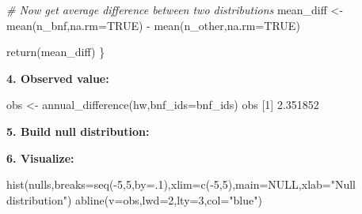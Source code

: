 \documentclass[
]{book}
\newenvironment{Shaded}{\begin{snugshade}}{\end{snugshade}}
\newcommand{\AttributeTok}[1]{\textcolor[rgb]{0.77,0.63,0.00}{#1}}
\newcommand{\CommentTok}[1]{\textcolor[rgb]{0.56,0.35,0.01}{\textit{#1}}}
\newcommand{\ConstantTok}[1]{\textcolor[rgb]{0.00,0.00,0.00}{#1}}
\newcommand{\ControlFlowTok}[1]{\textcolor[rgb]{0.13,0.29,0.53}{\textbf{#1}}}
\newcommand{\DecValTok}[1]{\textcolor[rgb]{0.00,0.00,0.81}{#1}}
\newcommand{\FloatTok}[1]{\textcolor[rgb]{0.00,0.00,0.81}{#1}}
\newcommand{\FunctionTok}[1]{\textcolor[rgb]{0.00,0.00,0.00}{#1}}
\newcommand{\NormalTok}[1]{#1}
\newcommand{\OtherTok}[1]{\textcolor[rgb]{0.56,0.35,0.01}{#1}}
\newcommand{\SpecialCharTok}[1]{\textcolor[rgb]{0.00,0.00,0.00}{#1}}
\newcommand{\StringTok}[1]{\textcolor[rgb]{0.31,0.60,0.02}{#1}}
\begin{document}
\begin{Shaded}
\begin{Highlighting}[]
  \CommentTok{\# Now get average difference between two distributions}
\NormalTok{  mean\_diff }\OtherTok{\textless{}{-}} \FunctionTok{mean}\NormalTok{(n\_bnf,}\AttributeTok{na.rm=}\ConstantTok{TRUE}\NormalTok{) }\SpecialCharTok{{-}} \FunctionTok{mean}\NormalTok{(n\_other,}\AttributeTok{na.rm=}\ConstantTok{TRUE}\NormalTok{)}
  
  \FunctionTok{return}\NormalTok{(mean\_diff)}
\NormalTok{\}}
\end{Highlighting}
\end{Shaded}

\textbf{4. Observed value:}

\begin{Shaded}
\begin{Highlighting}[]
\NormalTok{obs }\OtherTok{\textless{}{-}} \FunctionTok{annual\_difference}\NormalTok{(hw,}\AttributeTok{bnf\_ids=}\NormalTok{bnf\_ids)}
\NormalTok{obs }
\NormalTok{[}\DecValTok{1}\NormalTok{] }\FloatTok{2.351852}
\end{Highlighting}
\end{Shaded}

\textbf{5. Build null distribution:}

\begin{Shaded}
\end{Shaded}

\textbf{6. Visualize:}

\begin{Shaded}
\begin{Highlighting}[]
\FunctionTok{hist}\NormalTok{(nulls,}\AttributeTok{breaks=}\FunctionTok{seq}\NormalTok{(}\SpecialCharTok{{-}}\DecValTok{5}\NormalTok{,}\DecValTok{5}\NormalTok{,}\AttributeTok{by=}\NormalTok{.}\DecValTok{1}\NormalTok{),}\AttributeTok{xlim=}\FunctionTok{c}\NormalTok{(}\SpecialCharTok{{-}}\DecValTok{5}\NormalTok{,}\DecValTok{5}\NormalTok{),}\AttributeTok{main=}\ConstantTok{NULL}\NormalTok{,}\AttributeTok{xlab=}\StringTok{"Null distribution"}\NormalTok{)}
\FunctionTok{abline}\NormalTok{(}\AttributeTok{v=}\NormalTok{obs,}\AttributeTok{lwd=}\DecValTok{2}\NormalTok{,}\AttributeTok{lty=}\DecValTok{3}\NormalTok{,}\AttributeTok{col=}\StringTok{"blue"}\NormalTok{)}
\end{Highlighting}
\end{Shaded}
\end{document}
